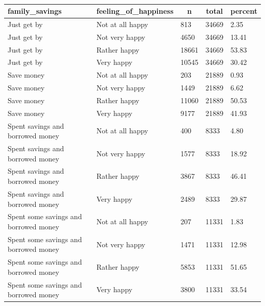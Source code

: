 \documentclass[man, fleqn, noextraspace,floatsintext]{apa6}
\begin{document}
\begin{table}[tbp]
\begin{center}
\begin{threeparttable}
\caption{\label{tab:happiness by family APA table}}
\begin{tabular}{lllll}
\toprule
family\_savings & \multicolumn{1}{c}{feeling\_of\_happiness} & \multicolumn{1}{c}{n} & \multicolumn{1}{c}{total} & \multicolumn{1}{c}{percent}\\
\midrule
Just get by & Not at all happy & 813 & 34669 & 2.35\\
Just get by & Not very happy & 4650 & 34669 & 13.41\\
Just get by & Rather happy & 18661 & 34669 & 53.83\\
Just get by & Very happy & 10545 & 34669 & 30.42\\
Save money & Not at all happy & 203 & 21889 & 0.93\\
Save money & Not very happy & 1449 & 21889 & 6.62\\
Save money & Rather happy & 11060 & 21889 & 50.53\\
Save money & Very happy & 9177 & 21889 & 41.93\\
Spent savings and borrowed money & Not at all happy & 400 & 8333 & 4.80\\
Spent savings and borrowed money & Not very happy & 1577 & 8333 & 18.92\\
Spent savings and borrowed money & Rather happy & 3867 & 8333 & 46.41\\
Spent savings and borrowed money & Very happy & 2489 & 8333 & 29.87\\
Spent some savings and borrowed money & Not at all happy & 207 & 11331 & 1.83\\
Spent some savings and borrowed money & Not very happy & 1471 & 11331 & 12.98\\
Spent some savings and borrowed money & Rather happy & 5853 & 11331 & 51.65\\
Spent some savings and borrowed money & Very happy & 3800 & 11331 & 33.54\\
\bottomrule
\end{tabular}
\end{threeparttable}
\end{center}
\end{table}
\end{document}
